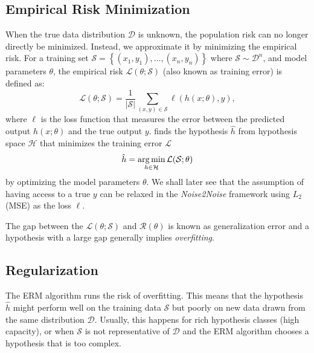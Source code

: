 \subsection{Empirical Risk Minimization}\label{sec:erm}
When the true data distribution $\mathcal{D}$ is unknown, the population risk can no longer directly be minimized. Instead, we approximate it by minimizing the empirical risk. For a training set $\mathcal{S} = \left\{ (x_1, y_1), \ldots, (x_n, y_n) \right\}$ where $\mathcal{S} \sim \mathcal{D}^n$, and model parameters $\theta$, the empirical risk $\mathcal{L}(\theta; \mathcal{S})$ (also known as training error)  is defined as:
\begin{equation}
    \mathcal{L}(\theta; \mathcal{S}) = \frac{1}{\lvert \mathcal{S} \rvert} \sum_{(x, y) \in \mathcal{S}} \ell(h(x; \theta), y),
\end{equation}
where $\ell$ is the loss function that measures the error between the predicted output $h(x; \theta)$ and the true output $y$.  finds the hypothesis $\hat{h}$ from hypothesis space $\mathcal{H}$ that minimizes the training error $\mathcal{L}$
\begin{equation}\label{eq:erm}
    \hat{h} = \operatorname*{arg\,min}_{h \in \mathcal{H}} \mathcal{L}(\mathcal{S};\theta)
\end{equation}
by optimizing the model parameters $\theta$.
We shall later see that the assumption of having access to a true $y$ can be relaxed in the \textit{Noise2Noise} framework using $L_2$ (\gls{MSE}) as the loss $\ell$.

The gap between the $\mathcal{L}(\theta; \mathcal{S})$ and $\mathcal{R}(\theta)$ is known as generalization error and a hypothesis with a large gap generally implies \textit{overfitting}.

\subsection{Regularization}
The \gls{ERM} algorithm runs the risk of overfitting. This means that the hypothesis $\hat{h}$ might perform well on the training data $\mathcal{S}$ but poorly on new data drawn from the same distribution $\mathcal{D}$. Usually, this happens for rich hypothesis classes (high capacity), or when $\mathcal{S}$ is not representative of $\mathcal{D}$ and the \gls{ERM} algorithm chooses a hypothesis that is too complex. 

